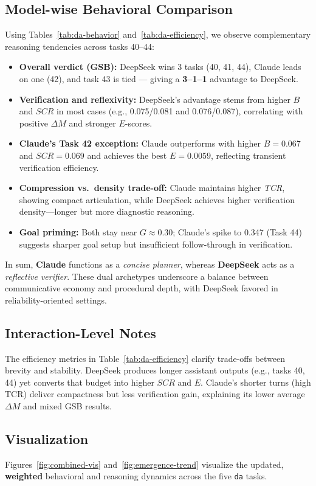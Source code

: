 \documentclass[11pt]{article}
\begin{document}
\subsection{Model-wise Behavioral Comparison}
Using Tables~\ref{tab:da-behavior} and~\ref{tab:da-efficiency}, we observe complementary reasoning tendencies across tasks 40--44:
\begin{itemize}
  \item \textbf{Overall verdict (GSB):} DeepSeek wins 3 tasks (40, 41, 44), Claude leads on one (42), and task 43 is tied — giving a \textbf{3--1--1} advantage to DeepSeek.
  \item \textbf{Verification and reflexivity:} DeepSeek’s advantage stems from higher $B$ and $SCR$ in most cases (e.g., 0.075/0.081 and 0.076/0.087), correlating with positive $\Delta M$ and stronger $E$-scores.
  \item \textbf{Claude’s Task 42 exception:} Claude outperforms with higher $B{=}0.067$ and $SCR{=}0.069$ and achieves the best $E{=}0.0059$, reflecting transient verification efficiency.
  \item \textbf{Compression vs.\ density trade-off:} Claude maintains higher \emph{TCR}, showing compact articulation, while DeepSeek achieves higher verification density—longer but more diagnostic reasoning.
  \item \textbf{Goal priming:} Both stay near $G\!\approx\!0.30$; Claude’s spike to 0.347 (Task 44) suggests sharper goal setup but insufficient follow-through in verification.
\end{itemize}
In sum, \textbf{Claude} functions as a \emph{concise planner}, whereas \textbf{DeepSeek} acts as a \emph{reflective verifier}. 
These dual archetypes underscore a balance between communicative economy and procedural depth, with DeepSeek favored in reliability-oriented settings.

\subsection{Interaction-Level Notes}
The efficiency metrics in Table~\ref{tab:da-efficiency} clarify trade-offs between brevity and stability.
DeepSeek produces longer assistant outputs (e.g., tasks 40, 44) yet converts that budget into higher $SCR$ and $E$.
Claude’s shorter turns (high TCR) deliver compactness but less verification gain, explaining its lower average $\Delta M$ and mixed GSB results.

\subsection{Visualization}
Figures~\ref{fig:combined-vis} and~\ref{fig:emergence-trend} visualize the updated, \textbf{weighted} behavioral and reasoning dynamics across the five \texttt{da} tasks.
\end{document}
